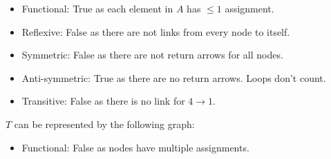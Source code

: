 \documentclass{article}
\begin{document}
\begin{enumerate}
\begin{enumerate}
{\begin{figure}[H]
                                        \end{figure}
                                        \begin{itemize}
                                                \item Functional: True as each element in $A$ has $\leq 1$ assignment.
                                                \item Reflexive: False as there are not links from every node to itself.
                                                \item Symmetric: False as there are not return arrows for all nodes.
                                                \item Anti-symmetric: True as there are no return arrows. Loops don't count.
                                                \item Transitive: False as there is no link for $4\rightarrow 1$.
                                        \end{itemize}
                                        \newpage
                                        $T$ can be represented by the following graph:
                                        \begin{figure}[H]
                                                \centering
                                        \end{figure}
                                        \begin{itemize}
                                                \item Functional: False as nodes have multiple assignments.

\end{itemize}}
\end{enumerate}
\end{enumerate}
\end{document}
